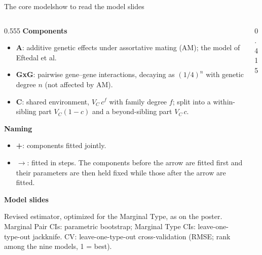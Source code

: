 \documentclass[aspectratio=169, 10pt]{beamer}
\newcommand{\mA}{\textcolor{cAddText}{\textbf{A}}}
\newcommand{\mG}{\textcolor{cGxGText}{\textbf{GxG}}}
\newcommand{\mC}{\textcolor{cFamText}{\textbf{C}}}
\begin{document}
\begin{frame}{The core models}{how to read the model slides}
  \vspace{-0.6em}
  \begin{columns}[T, onlytextwidth]
    \begin{column}{0.555\textwidth}\footnotesize
      {\color{navy}\bfseries Components}\par\smallskip
      \begin{itemize}\setlength{\itemsep}{0.2em}
        \item \mA: additive genetic effects under assortative mating (AM); the model of Eftedal et al.
        \item \mG: pairwise gene--gene interactions, decaying as $(1/4)^n$ with genetic degree $n$
              (not affected by AM).
        \item \mC: shared environment, $V_C\,c^{f}$ with family degree $f$; split into a
              within-sibling part $V_C(1-c)$ and a beyond-sibling part $V_C\,c$.
      \end{itemize}
      \smallskip
      {\color{navy}\bfseries Naming}\par\smallskip
      \begin{itemize}\setlength{\itemsep}{0.2em}
        \item \textbf{+}\;: components fitted jointly.
        \item $\rightarrow$\;: fitted in steps. The components before the arrow are fitted first and
              their parameters are then held fixed while those after the arrow are fitted.
      \end{itemize}
      \smallskip
      {\color{navy}\bfseries Model slides}\par\smallskip
      Revised estimator, optimized for the Marginal Type, as on the poster. Marginal Pair CIs:
      parametric bootstrap; Marginal Type CIs: leave-one-type-out jackknife. CV: leave-one-type-out
      cross-validation (RMSE; rank among the nine models, 1 = best).
    \end{column}
    \begin{column}{0.415\textwidth}\footnotesize
\end{column}
\end{columns}
\end{frame}
\end{document}
